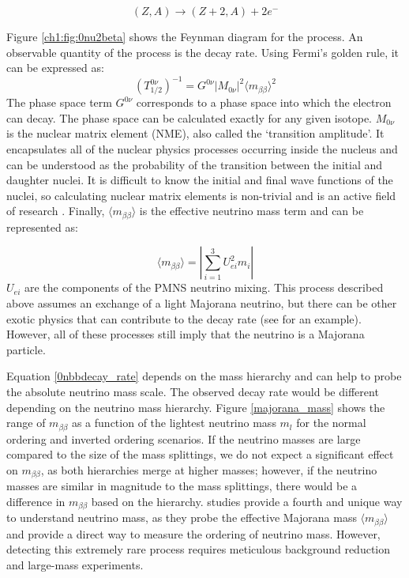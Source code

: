 \begin{equation}\label{0nbeta_decay_eq}
(Z,A) \rightarrow (Z+2,A) + 2e^-
\end{equation}



Figure \ref{ch1:fig:0nu2beta} shows the Feynman diagram for the process. An observable quantity of the process is the decay rate. Using Fermi's golden rule, it can be expressed as:
\begin{equation}\label{0nbbdecay_rate}
(T^{0\nu}_{1/2})^{-1} = G^{0\nu}\left|M_{0\nu}\right|^2\langle m_{\beta\beta}\rangle^2
\end{equation}
\noindent
The phase space term $G^{0\nu}$ corresponds to a phase space into which the electron can decay. The phase space can be calculated exactly for any given isotope. $M_{0\nu}$ is the nuclear matrix element (NME), also called the `transition amplitude'. It encapsulates all of the nuclear physics processes occurring inside the nucleus and can be understood as the probability of the transition between the initial and daughter nuclei. It is difficult to know the initial and final wave functions of the nuclei, so calculating nuclear matrix elements is non-trivial and is an active field of research \cite{Menendez:2017fdf}. Finally, $\langle m_{\beta\beta}\rangle$ is the effective neutrino mass term and can be represented as:

\begin{equation}\label{effective_mjd_mass}
\langle m_{\beta\beta}\rangle =  \left|\sum_{i=1}^{3} U^2_{ei}m_i\right|
\end{equation}
\noindent
$U_{ei}$ are the components of the PMNS neutrino mixing. This process described above assumes an exchange of a light Majorana neutrino, but there can be other exotic physics that can contribute to the decay rate (see \cite{Schechter_1982} for an example). However, all of these processes still imply that the neutrino is a Majorana particle.

Equation \ref{0nbbdecay_rate} depends on the mass hierarchy and can help to probe the absolute neutrino mass scale. The observed decay rate would be different depending on the neutrino mass hierarchy. Figure \ref{majorana_mass} shows the range of $m_{\beta\beta}$ as a function of the lightest neutrino mass $m_l$ for the normal ordering and inverted ordering scenarios. If the neutrino masses are large compared to the size of the mass splittings, we do not expect a significant effect on $m_{\beta\beta}$, as both hierarchies merge at higher masses; however, if the neutrino masses are similar in magnitude to the mass splittings, there would be a difference in $m_{\beta\beta}$ based on the hierarchy. {\onbb} studies provide a fourth and unique way to understand neutrino mass, as they probe the effective Majorana mass $\langle m_{\beta\beta}\rangle$ and provide a direct way to measure the ordering of neutrino mass. However, detecting this extremely rare process requires meticulous background reduction and large-mass experiments.

